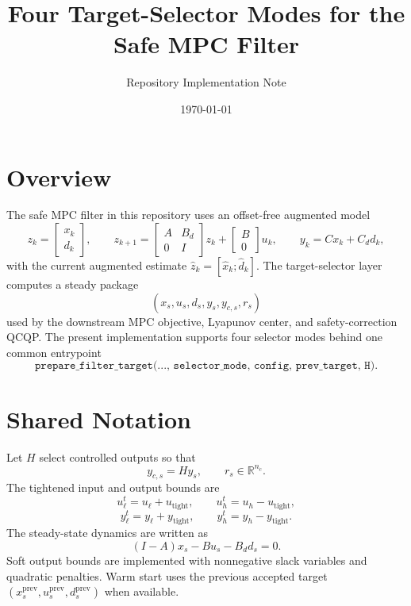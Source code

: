 \documentclass[11pt]{article}
\title{Four Target-Selector Modes for the Safe MPC Filter}
\author{Repository Implementation Note}
\date{\today}
\begin{document}
\maketitle

\section{Overview}
The safe MPC filter in this repository uses an offset-free augmented model
\begin{equation}
z_k = \begin{bmatrix} x_k \\ d_k \end{bmatrix},
\qquad
z_{k+1} =
\begin{bmatrix}
A & B_d \\
0 & I
\end{bmatrix}
z_k +
\begin{bmatrix}
B \\ 0
\end{bmatrix} u_k,
\qquad
y_k = Cx_k + C_d d_k,
\end{equation}
with the current augmented estimate $\hat z_k = [\hat x_k;\hat d_k]$. The target-selector layer computes a steady package
\[
(x_s,u_s,d_s,y_s,y_{c,s},r_s)
\]
used by the downstream MPC objective, Lyapunov center, and safety-correction QCQP. The present implementation supports four selector modes behind one common entrypoint
\[
\texttt{prepare\_filter\_target(..., selector\_mode, config, prev\_target, H)}.
\]

\section{Shared Notation}
Let $H$ select controlled outputs so that
\[
y_{c,s} = Hy_s, \qquad r_s \in \mathbb{R}^{n_c}.
\]
The tightened input and output bounds are
\[
u_{\ell}^{t} = u_{\ell}+u_{\text{tight}}, \qquad u_{h}^{t} = u_h-u_{\text{tight}},
\]
\[
y_{\ell}^{t} = y_{\ell}+y_{\text{tight}}, \qquad y_{h}^{t} = y_h-y_{\text{tight}}.
\]
The steady-state dynamics are written as
\[
(I-A)x_s - Bu_s - B_d d_s = 0.
\]
Soft output bounds are implemented with nonnegative slack variables and quadratic penalties. Warm start uses the previous accepted target $(x_s^{\text{prev}},u_s^{\text{prev}},d_s^{\text{prev}})$ when available.
\end{document}
